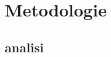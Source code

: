\documentclass[../Relazione.tex]{subfiles}
\begin{document}
\section{Metodologie}
    
    \subsection{analisi}
        
         
\end{document}
